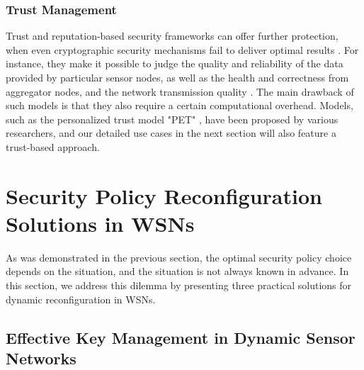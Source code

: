 \documentclass[12pt,a4paper,twoside]{report}
\begin{document}
\subsubsection{Trust Management}
Trust and reputation-based security frameworks can offer further protection, when even cryptographic security mechanisms fail to deliver optimal results \cite{sen:2009}. For instance, they make it possible to judge the quality and reliability of the data provided by particular sensor nodes, as well as the health and correctness from  aggregator nodes, and the network transmission quality \cite{sen:2009}. The main drawback of such models is that they also require a certain computational overhead. Models, such as the personalized trust model "PET" \cite{liang;shi:2005}, have been proposed by various researchers, and our detailed use cases in the next section will also feature a trust-based approach.\par









\section{Security Policy Reconfiguration Solutions in WSNs}
\label{sec:main}
As was demonstrated in the previous section, the optimal security policy choice depends on the situation, and the situation is not always known in advance. In this section, we address this dilemma by presenting three practical solutions for dynamic reconfiguration in WSNs. 

\subsection{Effective Key Management in Dynamic Sensor Networks}
\end{document}
